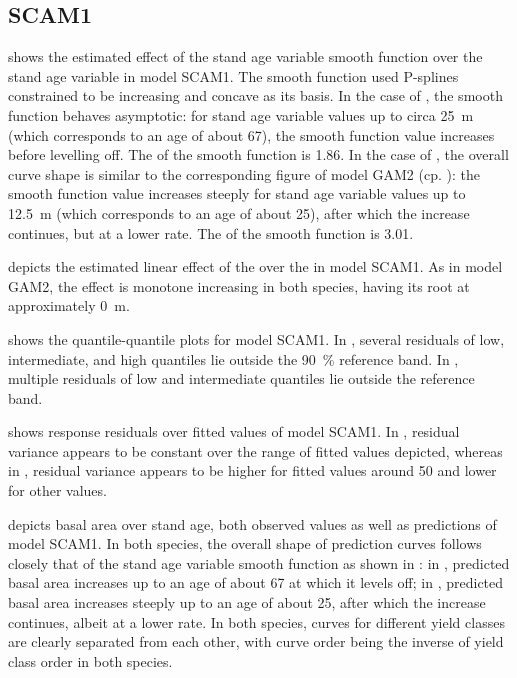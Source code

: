 \subsection{SCAM1}

 shows the estimated effect of the stand age variable smooth function over the stand age variable in model SCAM1.  The smooth function used P-splines constrained to be increasing and concave as its basis.  In the case of \Beech{}, the smooth function behaves asymptotic:  for stand age variable values up to circa \SI{25}{\meter} (which corresponds to an age of about \SI{67}{\year}), the smooth function value increases before levelling off.  The \edf{} of the smooth function is \num{1.86}.  In the case of \Spruce{}, the overall curve shape is similar to the corresponding figure of model GAM2 (cp. ):  the smooth function value increases steeply for stand age variable values up to \SI{12.5}{\meter} (which corresponds to an age of about \SI{25}{\year}), after which the increase continues, but at a lower rate.  The \edf{} of the smooth function is \num{3.01}.

 depicts the estimated linear effect of the \ProductivityIndexVariableText{} over the \ProductivityIndexVariableText{} in model SCAM1.  As in model GAM2, the effect is monotone increasing in both species, having its root at approximately \SI{0}{\meter}.

 shows the quantile-quantile plots for model SCAM1.  In \Beech{}, several residuals of low, intermediate, and high quantiles lie outside the \SI{90}{\percent} reference band.  In \Spruce{}, multiple residuals of low and intermediate quantiles lie outside the reference band.

 shows response residuals over fitted values of model SCAM1.  In \Beech{}, residual variance appears to be constant over the range of fitted values depicted, whereas in \Spruce{}, residual variance appears to be higher for fitted values around \num{50} and lower for other values.

 depicts basal area over stand age, both observed values as well as predictions of model SCAM1.  In both species, the overall shape of prediction curves follows closely that of the stand age variable smooth function as shown in :  in \Beech{}, predicted basal area increases up to an age of about \SI{67}{\year} at which it levels off;  in \Spruce{}, predicted basal area increases steeply up to an age of about \SI{25}{\year}, after which the increase continues, albeit at a lower rate.  In both species, curves for different yield classes are clearly separated from each other, with curve order being the inverse of yield class order in both species.

